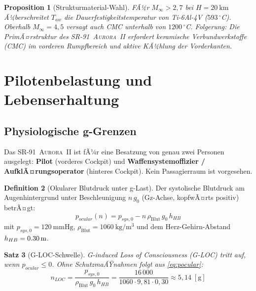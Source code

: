 ﻿\documentclass[12pt,a4paper]{article}
\theoremstyle{plain}
\newtheorem{theorem}{Satz}[section]
\newtheorem{proposition}[theorem]{Proposition}
\theoremstyle{definition}
\newtheorem{definition}[theorem]{Definition}
\theoremstyle{remark}
\newcommand{\SR}{\textsc{SR-91~Aurora~II}}
\begin{document}
\begin{proposition}[Strukturmaterial-Wahl]
  FÃ¼r $M_\infty > 2{,}7$ bei $H = \SI{20}{\kilo\metre}$ Ã¼berschreitet $T_{aw}$
  die Dauerfestigkeitstemperatur von Ti-6Al-4V ($593\,{}^\circ$C). Oberhalb
  $M_\infty = 4{,}5$ versagt auch CMC unterhalb von $1200\,{}^\circ$C.
  Folgerung: Die PrimÃ¤rstruktur des \SR{} erfordert keramische Verbundwerkstoffe
  (CMC) im vorderen Rumpfbereich und aktive KÃ¼hlung der Vorderkanten.
\end{proposition}

\section{Pilotenbelastung und Lebenserhaltung}
\label{sec:pilot}

\subsection{Physiologische g-Grenzen}

Das \SR{} ist fÃ¼r eine Besatzung von genau zwei Personen ausgelegt:
\textbf{Pilot} (vorderes Cockpit) und \textbf{Waffensystemoffizier / AufklÃ¤rungsoperator}
(hinteres Cockpit). Kein Passagierraum ist vorgesehen.

\begin{definition}[Okularer Blutdruck unter g-Last]
  Der systolische Blutdruck am Augenhintergrund unter Beschleunigung $n\,g_0$
  (Gz-Achse, kopfwÃ¤rts positiv) betrÃ¤gt:
  \begin{equation}
    p_{ocular}(n) = p_{sys,0} - n\,\rho_{\text{Blut}}\,g_0\,h_{HB}
    \label{eq:pocular}
  \end{equation}
  mit $p_{sys,0} = \SI{120}{\mmHg}$, $\rho_{\text{Blut}} = \SI{1060}{\kilo\gram\per\cubic\metre}$
  und dem Herz-Gehirn-Abstand $h_{HB} = \SI{0{,}30}{\metre}$.
\end{definition}

\begin{theorem}[G-LOC-Schwelle]
  \label{thm:gloc}
  G-induced Loss of Consciousness (G-LOC) tritt auf, wenn $p_{ocular} \leq 0$.
  Ohne SchutzmaÃŸnahmen folgt aus \cref{eq:pocular}:
  \begin{equation}
    n_{LOC} = \frac{p_{sys,0}}{\rho_{\text{Blut}}\,g_0\,h_{HB}}
    = \frac{16\,000}{1060 \cdot 9{,}81 \cdot 0{,}30}
    \approx 5{,}14\;[\text{g}]
    \label{eq:nloc}
  \end{equation}
\end{theorem}
\end{document}
